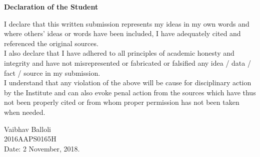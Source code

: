 \thispagestyle{empty}
\begin{center}
\textbf{\Large{Declaration of the Student}}
\end{center}
\vfill

\large {I declare that this written submission represents my ideas in my own words and where
others' ideas or words have been included, I have adequately cited and referenced the
original sources.\\

I also declare that I have adhered to all principles of academic honesty and integrity and
have not misrepresented or fabricated or falsified any idea / data / fact / source in my
submission.\\

I understand that any violation of the above will be cause for disciplinary action by the
Institute and can also evoke penal action from the sources which have thus not been
properly cited or from whom proper permission has not been taken when needed.\\
}

\vfill

\begin{flushleft}
\large{
	Vaibhav Balloli\\
	[0.2cm]
	2016AAPS0165H\\
	[0.2cm]
	Date: 2 November, 2018.
}
\end{flushleft}